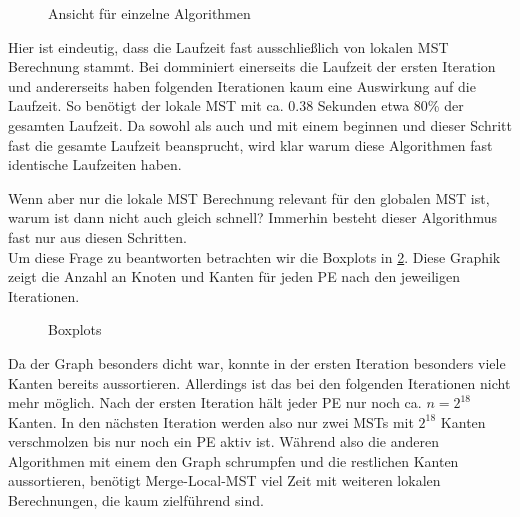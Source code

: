 \begin{figure}[H]
    \centering
    
    

    
   
    \caption{Ansicht für einzelne Algorithmen}
    \label{Explicit-dense-Img}
\end{figure}


Hier ist eindeutig, dass die Laufzeit fast ausschließlich von lokalen MST Berechnung stammt. Bei \boruvkaAllreduce domminiert einerseits die Laufzeit der ersten Iteration und andererseits haben folgenden Iterationen kaum eine Auswirkung auf die Laufzeit.
So benötigt der lokale MST mit ca. 0.38 Sekunden etwa 80\% der gesamten Laufzeit. Da sowohl \boruvkaAllreduce als auch \boruvkaThenMerge und \boruvkaMixedMerge mit einem \boruvkaStep beginnen und dieser Schritt fast die gesamte Laufzeit beansprucht, wird klar warum diese Algorithmen fast identische Laufzeiten haben.


Wenn aber nur die lokale MST Berechnung relevant für den globalen MST ist, warum ist dann nicht auch \mergeMST gleich schnell? Immerhin besteht dieser Algorithmus fast nur aus diesen Schritten. \\
Um diese Frage zu beantworten betrachten wir die Boxplots in \cref{Boxplot-dense-Img}.
Diese Graphik zeigt die Anzahl an Knoten und Kanten für jeden PE nach den jeweiligen Iterationen.



\begin{figure}[H]
    \centering
    
    
    \caption{Boxplots}
    \label{Boxplot-dense-Img}
\end{figure}

Da der Graph besonders dicht war, konnte \mergeMST in der ersten Iteration besonders viele Kanten bereits aussortieren. Allerdings ist das bei den folgenden Iterationen nicht mehr möglich. Nach der ersten Iteration hält jeder PE nur noch ca. $n=2^{18}$ Kanten. In den nächsten Iteration werden also nur zwei MSTs mit $2^{18}$ Kanten verschmolzen bis nur noch ein PE aktiv ist.
Während also die anderen Algorithmen mit einem \boruvkaStep den Graph schrumpfen und die restlichen Kanten aussortieren, benötigt Merge-Local-MST viel Zeit mit weiteren lokalen Berechnungen, die kaum zielführend sind. 




